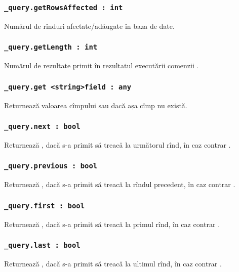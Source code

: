 \subsubsection{\lstinline|_query.getRowsAffected : int|}

Numărul de rînduri afectate/adăugate în baza de date.

\subsubsection{\lstinline|_query.getLength : int|}

Numărul de rezultate primit în rezultatul executării comenzii .

\subsubsection{\lstinline|_query.get <string>field : any|}

Returnează valoarea cîmpului  sau \void{} dacă așa cîmp nu există.

\subsubsection{\lstinline|_query.next : bool|}

Returnează \true, dacă s-a primit să treacă la următorul rînd, în caz contrar \false.

\subsubsection{\lstinline|_query.previous : bool|}

Returnează \true, dacă s-a primit să treacă la rîndul precedent, în caz contrar \false.

\subsubsection{\lstinline|_query.first : bool|}

Returnează \true, dacă s-a primit să treacă la primul rînd, în caz contrar \false.

\subsubsection{\lstinline|_query.last : bool|}

Returnează \true, dacă s-a primit să treacă la ultimul rînd, în caz contrar \false.

